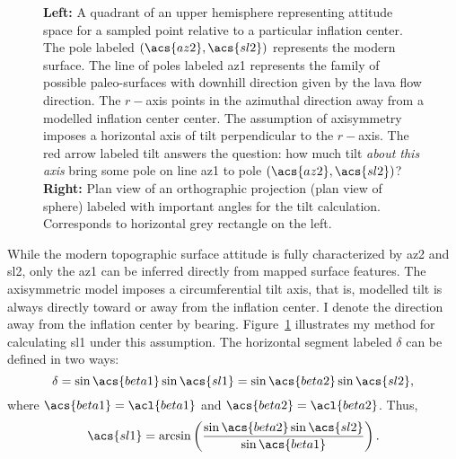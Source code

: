 \begin{figure}
\begin{center}
    \hspace{1cm}%
    \caption[\Acl{tilt} from mapping]{\textbf{Left:} A quadrant of an upper hemisphere representing attitude space for a sampled point relative to a particular inflation center. The pole labeled $\left(\acs{az2},\acs{sl2}\right)$ represents the modern surface. The line of poles labeled \acs{az1} represents the family of possible paleo-surfaces with downhill direction given by the lava flow direction. The $r-$axis points in the azimuthal direction away from a modelled inflation center \acs{center}. The assumption of axisymmetry imposes a horizontal axis of tilt perpendicular to the $r-$axis. The red arrow labeled \acs{tilt} answers the question: how much tilt \emph{about this axis} bring some pole on line \acs{az1} to pole $\left(\acs{az2},\acs{sl2}\right)$? \textbf{Right:} Plan view of an orthographic projection (plan view of sphere) labeled with important angles for the tilt calculation. Corresponds to horizontal grey rectangle on the left.}%
    \label{fig:tilt-from-map}%
\end{center}
\end{figure}
While the modern topographic surface attitude is fully characterized by \acs{az2} and \acs{sl2}, only the \acf{az1} can be inferred directly from mapped surface features. The axisymmetric model imposes a circumferential tilt axis, that is, modelled tilt is always directly toward or away from the inflation center. I denote the direction away from the inflation center by \acs{bearing}. Figure~\ref{fig:tilt-from-map} illustrates my method for calculating \acf{sl1} under this assumption. The horizontal segment labeled $\delta$ can be defined in two ways:
\begin{equation*}
    \delta = \sin\acs{beta1}\sin\acs{sl1} = \sin\acs{beta2}\sin\acs{sl2},
\end{equation*}
where $\acs{beta1} = \acl{beta1}$ and $\acs{beta2} = \acl{beta2}$. Thus,
\begin{equation}
    \acs{sl1} = \arcsin\left(\frac{\sin\acs{beta2}\sin\acs{sl2}}{\sin\acs{beta1}}\right).\label{eq:sl1}
\end{equation}

